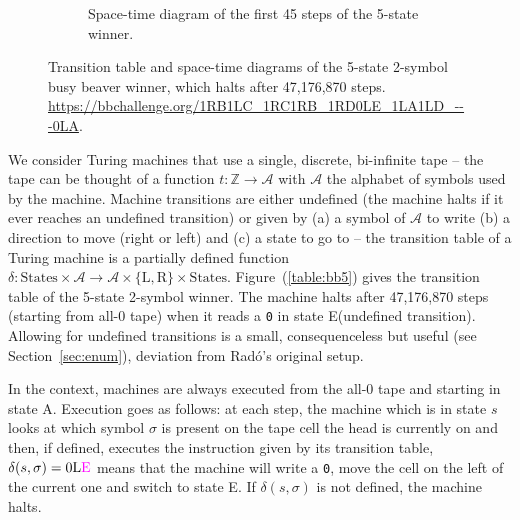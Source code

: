 \documentclass[a4paper,british]{article}
\theoremstyle{definition} %
\numberwithin{equation}{section}
\theoremstyle{definition} %
\newcommand{\stateA}{{\textcolor{colorA}{A}}\xspace}
\newcommand{\stateE}{{\textcolor{colorE}{E}}\xspace}
\newcommand{\szero}{\texttt{0}\xspace}
\newcommand{\rado}{Rad\'o\xspace}
\newcommand{\alphabet}{\mathcal{A}}
\begin{document}
\begin{figure}[h!]
\begin{subfigure}[t]{0.45\textwidth}
        \caption{Space-time diagram of the first 45 steps of the 5-state winner.}
        \label{fig:bb5-diagram}
    \end{subfigure}
    \caption{Transition table and space-time diagrams of the 5-state 2-symbol busy beaver winner, which halts after 47,176,870 steps.
        \url{https://bbchallenge.org/1RB1LC_1RC1RB_1RD0LE_1LA1LD_---0LA}.}
    \label{fig:bb5}
\end{figure}


We consider Turing machines that use a single, discrete, bi-infinite tape -- \ie the tape can be thought of a function $t: \mathbb{Z} \to \alphabet$ with $\alphabet$ the alphabet of symbols used by the machine. Machine transitions are either undefined (the machine halts if it ever reaches an undefined transition) or given by (a) a symbol of $\alphabet$ to write (b) a direction to move (right or left) and (c) a state to go to -- \ie the transition table of a Turing machine is a partially defined function $\delta: \text{States} \times \alphabet \to \alphabet \times \{\text{L},\text{R}\} \times \text{States}$. Figure~(\ref{table:bb5}) gives the transition table of the 5-state 2-symbol \BBfull winner. The machine halts after 47,176,870 steps (starting from all-0 tape) when it reads a \szero in state \stateE (undefined transition). Allowing for undefined transitions is a small, consequenceless but useful (see Section~\ref{sec:enum}), deviation from \rado's original setup.

In the \BBfull context, machines are always executed from the all-0 tape and starting in state \stateA. Execution goes as follows: at each step, the machine which is in state $s$ looks at which symbol $\sigma$ is present on the tape cell the head is currently on and then, if defined, executes the instruction given by its transition table, \eg $\delta(s, \sigma) = 0\text{L}\text{\stateE}$ means that the machine will write a \szero, move the cell on the left of the current one and switch to state \stateE. If $\delta(s, \sigma)$ is not defined, the machine halts.
\end{document}
